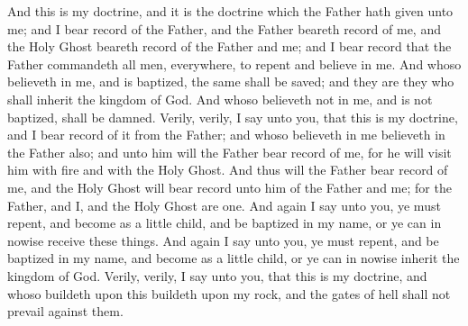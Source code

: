 And this is my doctrine, and it is the doctrine which the Father hath given unto me; and I bear record of the Father, and the Father beareth record of me, and the Holy Ghost beareth record of the Father and me; and I bear record that the Father commandeth all men, everywhere, to repent and believe in me.
\bverse \iffalse And whoso believeth in me, and is baptized, the same shall be saved; and they are they who shall inherit the kingdom of God. \fi
And whoso believeth in me, and is baptized, the same shall be saved; and they are they who shall inherit the kingdom of God.
\bverse \iffalse And whoso believeth not in me, and is not baptized, shall be damned. \fi
And whoso believeth not in me, and is not baptized, shall be damned.
\bverse \iffalse Verily, verily, I say unto you, that this is my doctrine, and I bear record of it from the Father; and whoso believeth in me believeth in the Father also; and unto him will the Father bear record of me, for he will visit him with fire and with the Holy Ghost. \fi
Verily, verily, I say unto you, that this is my doctrine, and I bear record of it from the Father; and whoso believeth in me believeth in the Father also; and unto him will the Father bear record of me, for he will visit him with fire and with the Holy Ghost.
\bverse \iffalse And thus will the Father bear record of me, and the Holy Ghost will bear record unto him of the Father and me; for the Father, and I, and the Holy Ghost are one. \fi
And thus will the Father bear record of me, and the Holy Ghost will bear record unto him of the Father and me; for the Father, and I, and the Holy Ghost are one.
\bverse \iffalse And again I say unto you, ye must repent, and become as a little child, and be baptized in my name, or ye can in nowise receive these things. \fi
And again I say unto you, ye must repent, and become as a little child, and be baptized in my name, or ye can in nowise receive these things.
\bverse \iffalse And again I say unto you, ye must repent, and be baptized in my name, and become as a little child, or ye can in nowise inherit the kingdom of God. \fi
And again I say unto you, ye must repent, and be baptized in my name, and become as a little child, or ye can in nowise inherit the kingdom of God.
\bverse \iffalse Verily, verily, I say unto you, that this is my doctrine, and whoso buildeth upon this buildeth upon my rock, and the gates of hell shall not prevail against them. \fi
Verily, verily, I say unto you, that this is my doctrine, and whoso buildeth upon this buildeth upon my rock, and the gates of hell shall not prevail against them.
